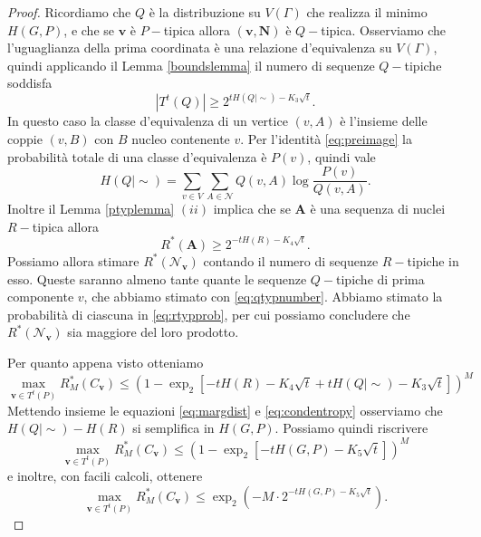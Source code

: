 \begin{proof}
  Ricordiamo che \(Q\) è la distribuzione su \(V(\Gamma)\) che realizza il minimo \(H(G,P)\), e che se \(\mathbf{v}\) è \(P-\)tipica allora \((\mathbf{v}, \mathbf{N})\) è \(Q-\)tipica. Osserviamo che l'uguaglianza della prima coordinata è una relazione d'equivalenza su \(V(\Gamma)\), quindi applicando il Lemma \ref{boundslemma} il numero di sequenze \(Q-\)tipiche soddisfa 
  \begin{equation}
    \label{eq:qtypnumber} \left\vert T^{t}(Q)\right\vert \ge 2^{tH(Q\mid\sim)-K_{3}\sqrt{t}}. 
  \end{equation}
  In questo caso la classe d'equivalenza di un vertice \((v,A)\) è l'insieme delle coppie \((v,B)\) con \(B\) nucleo contenente \(v\). Per l'identità \eqref{eq:preimage} la probabilità totale di una classe d'equivalenza è \(P(v)\), quindi vale 
  \begin{equation}
    \label{eq:condentropy} H(Q\mid\sim)=\sum_{v\in V} \sum_{A\in \mathcal{N}} Q(v,A)\log{\frac{P(v)}{Q(v,A)}}. 
  \end{equation}
  Inoltre il Lemma \ref{ptyplemma} \((ii)\) implica che se \(\mathbf{A}\) è una sequenza di nuclei \(R-\)tipica allora 
  \begin{equation}
    \label{eq:rtypprob} R^{*}(\mathbf{A})\ge 2^{-tH(R)-K_{4}\sqrt{t}}. 
  \end{equation}
  Possiamo allora stimare \(R^{*}(\mathcal{N}_{\mathbf{v}})\) contando il numero di sequenze \(R-\)tipiche in esso. Queste saranno almeno tante quante le sequenze \(Q-\)tipiche di prima componente \(v\), che abbiamo stimato con \eqref{eq:qtypnumber}. Abbiamo stimato la probabilità di ciascuna in \eqref{eq:rtypprob}, per cui possiamo concludere che \(R^{*}(\mathcal{N}_{\mathbf{v}})\) sia maggiore del loro prodotto.
	
  Per quanto appena visto otteniamo 
  \begin{equation}
    \max_{\mathbf{v}\in T^t(P)} R_{M}^{*}(C_{\mathbf{v}})\le \left(1- \exp_{2}{\left[-tH(R) - K_{4}\sqrt{t} + tH(Q\mid\sim) - K_{3}\sqrt{t}\right]}\right)^{M} 
  \end{equation}
  Mettendo insieme le equazioni \eqref{eq:margdist} e \eqref{eq:condentropy} osserviamo che \(H(Q\mid\sim) - H(R)\) si semplifica in \(H(G,P)\). Possiamo quindi riscrivere
  \[\max_{\mathbf{v}\in T^t(P)} R_{M}^{*}(C_{\mathbf{v}})\le \left(1- \exp_{2}{\left[-tH(G,P) - K_{5}\sqrt{t}\right]}\right)^{M}\]
  e inoltre, con facili calcoli, ottenere
  \[\max_{\mathbf{v}\in T^t(P)} R_{M}^{*}(C_{\mathbf{v}})\le \exp_{2}\left(-M\cdot 2^{-tH(G,P) - K_{5}\sqrt{t}}\right).\]
  

\end{proof}
